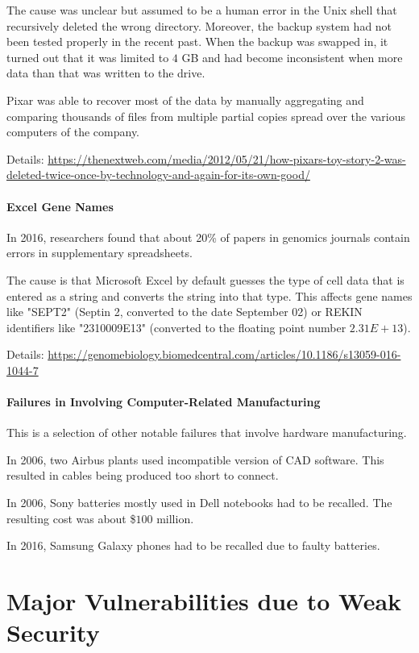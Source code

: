 The cause was unclear but assumed to be a human error in the Unix shell that recursively deleted the wrong directory.
Moreover, the backup system had not been tested properly in the recent past.
When the backup was swapped in, it turned out that it was limited to $4$ GB and had become inconsistent when more data than that was written to the drive.

Pixar was able to recover most of the data by manually aggregating and comparing thousands of files from multiple partial copies spread over the various computers of the company.

Details: \url{https://thenextweb.com/media/2012/05/21/how-pixars-toy-story-2-was-deleted-twice-once-by-technology-and-again-for-its-own-good/}

\paragraph{Excel Gene Names}
In 2016, researchers found that about 20\% of papers in genomics journals contain errors in supplementary spreadsheets.

The cause is that Microsoft Excel by default guesses the type of cell data that is entered as a string and converts the string into that type.
This affects gene names like "SEPT2" (Septin 2, converted to the date September 02) or REKIN identifiers like "2310009E13" (converted to the floating point number $2.31E+13$).

Details: \url{https://genomebiology.biomedcentral.com/articles/10.1186/s13059-016-1044-7}

\paragraph{Failures in Involving Computer-Related Manufacturing}
This is a selection of other notable failures that involve hardware manufacturing.

In 2006, two Airbus plants used incompatible version of CAD software.
This resulted in cables being produced too short to connect.

In 2006, Sony batteries mostly used in Dell notebooks had to be recalled.
The resulting cost was about \$$100$ million.

In 2016, Samsung Galaxy phones had to be recalled due to faulty batteries.

\section{Major Vulnerabilities due to Weak Security}


